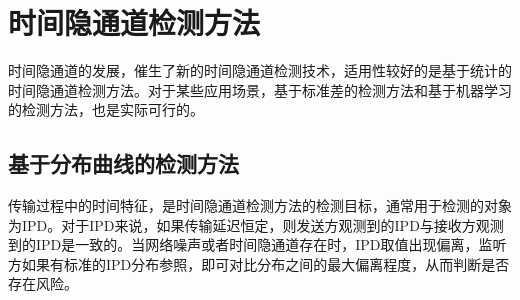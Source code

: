 \section{时间隐通道检测方法}
\label{chap:backinfo:detect}

时间隐通道的发展，催生了新的时间隐通道检测技术，适用性较好的是基于统计的时间隐通道检测方法。对于某些应用场景，基于标准差的检测方法和基于机器学习的检测方法，也是实际可行的。

\subsection{基于分布曲线的检测方法}
\label{chap:backinfo:detect:statistical}

传输过程中的时间特征，是时间隐通道检测方法的检测目标，通常用于检测的对象为IPD。对于IPD来说，如果传输延迟恒定，则发送方观测到的IPD与接收方观测到的IPD是一致的。当网络噪声或者时间隐通道存在时，IPD取值出现偏离，监听方如果有标准的IPD分布参照，即可对比分布之间的最大偏离程度，从而判断是否存在风险。



